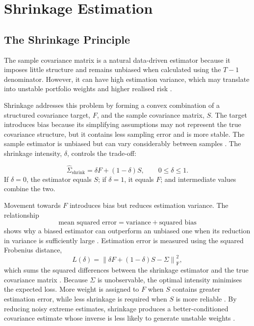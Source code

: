 \section{Shrinkage Estimation}

\subsection{The Shrinkage Principle}

The sample covariance matrix is a natural data-driven estimator because it imposes little structure and remains unbiased when calculated using the \(T-1\) denominator. However, it can have high estimation variance, which may translate into unstable portfolio weights and higher realised risk \parencite[111]{ledoit2004honey}.

Shrinkage addresses this problem by forming a convex combination of a structured covariance target, \(F\), and the sample covariance matrix, \(S\). The target introduces bias because its simplifying assumptions may not represent the true covariance structure, but it contains less sampling error and is more stable. The sample estimator is unbiased but can vary considerably between samples \parencite[608]{LEDOIT2003603}. The shrinkage intensity, \(\delta\), controls the trade-off:

\[
\widehat{\Sigma}_{\text{shrink}}
= \delta F + (1-\delta)S,
\qquad 0 \leq \delta \leq 1.
\]
If \(\delta=0\), the estimator equals \(S\); if \(\delta=1\), it equals \(F\); and intermediate values combine the two.

Movement towards \(F\) introduces bias but reduces estimation variance. The relationship
\[
\text{mean squared error}=\text{variance}+\text{squared bias}
\]
shows why a biased estimator can outperform an unbiased one when its reduction in variance is sufficiently large \parencite[370]{ledoit2004well}. Estimation error is measured using the squared Frobenius distance,
\[
L(\delta)=\left\|\delta F+(1-\delta)S-\Sigma\right\|_{\mathrm{F}}^2,
\]
which sums the squared differences between the shrinkage estimator and the true covariance matrix \parencite[608--609]{LEDOIT2003603}. Because \(\Sigma\) is unobservable, the optimal intensity minimises the expected loss. More weight is assigned to \(F\) when \(S\) contains greater estimation error, while less shrinkage is required when \(S\) is more reliable \parencite[369]{ledoit2004well}. By reducing noisy extreme estimates, shrinkage produces a better-conditioned covariance estimate whose inverse is less likely to generate unstable weights \parencites[111]{ledoit2004honey}[614]{LEDOIT2003603}.

